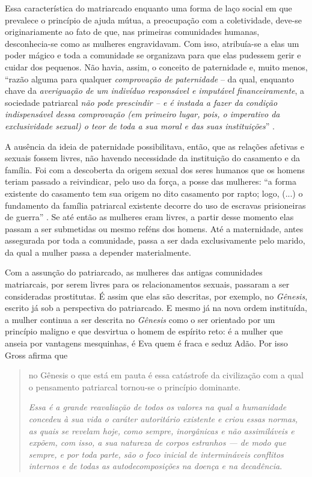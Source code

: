 Essa característica do matriarcado enquanto uma forma de laço social em
que prevalece o princípio de ajuda mútua, a preocupação com a
coletividade, deve-se originariamente ao fato de que, nas primeiras
comunidades humanas, desconhecia-se como as mulheres engravidavam. Com
isso, atribuía-se a elas um poder mágico e toda a comunidade se
organizava para que elas pudessem gerir e cuidar dos pequenos. Não
havia, assim, o conceito de paternidade e, muito menos, ``razão alguma
para qualquer \emph{comprovação de paternidade} -- da qual, enquanto
chave da \emph{averiguação de um indivíduo responsável e imputável
financeiramente}, a sociedade patriarcal \emph{não pode prescindir -- e
é instada a fazer da condição indispensável dessa comprovação (em
primeiro lugar, pois, o imperativo da exclusividade sexual) o teor de
toda a sua moral e das suas instituições}'' .

A ausência da ideia de paternidade possibilitava, então, que as relações
afetivas e sexuais fossem livres, não havendo necessidade da instituição
do casamento e da família. Foi com a descoberta da origem sexual dos
seres humanos que os homens teriam passado a reivindicar, pelo uso da
força, a posse das mulheres: ``a forma existente do casamento tem sua
origem no dito casamento por rapto; logo, (...) o fundamento da família
patriarcal existente decorre do uso de escravas prisioneiras de guerra''
. Se até então as mulheres eram livres, a partir desse momento elas
passam a ser submetidas ou mesmo reféns dos homens. Até a maternidade,
antes assegurada por toda a comunidade, passa a ser dada exclusivamente
pelo marido, da qual a mulher passa a depender materialmente.

Com a assunção do patriarcado, as mulheres das antigas comunidades
matriarcais, por serem livres para os relacionamentos sexuais, passaram
a ser consideradas prostitutas. É assim que elas são descritas, por
exemplo, no \emph{Gênesis}, escrito já sob a perspectiva do patriarcado.
E mesmo já na nova ordem instituída, a mulher continua a ser descrita no
\emph{Gênesis} como o ser orientado por um princípio maligno e que
desvirtua o homem de espírito reto: é a mulher que anseia por vantagens
mesquinhas, é Eva quem é fraca e seduz Adão. Por isso Gross afirma que

\begin{quote}
no Gênesis o que está em pauta é essa catástrofe da civilização com a
qual o pensamento patriarcal tornou-se o princípio dominante.

\emph{Essa é a grande reavaliação de todos os valores na qual a
humanidade concedeu à sua vida o caráter autoritário existente e criou
essas normas, as quais se revelam hoje, como sempre, inorgânicas e não
assimiláveis e expõem, com isso, a sua natureza de corpos estranhos ---
de modo que sempre, e por toda parte, são o foco inicial de
intermináveis conflitos internos e de todas as autodecomposições na
doença e na decadência}.
\end{quote}

